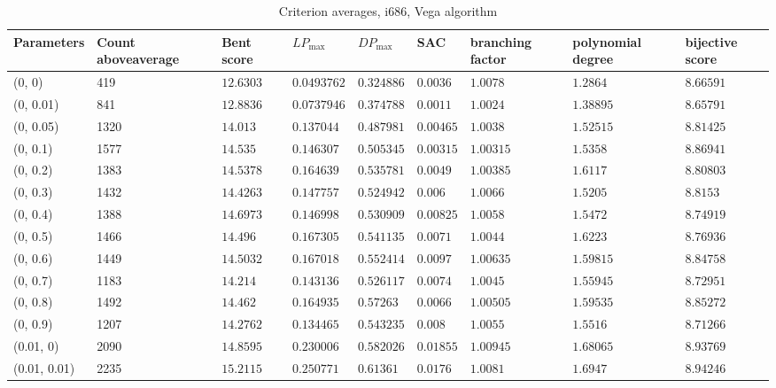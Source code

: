 \begin{center}
{\begin{longtable}{| l | p{} |  p{} | p{} | p{} | p{} | p{} | p{} | p{} |}
\caption{Criterion averages, i686, Vega algorithm}\label{tabVegaParametersLuffa}\\
\hline
Parameters & Count above\-average  & Bent score & $LP_{\max}$ & $DP_{\max}$ & SAC & branching factor & polynomial degree & bijective score \\ \hline
\endhead
 (0, 0) & 419  & $12.6303$ & $0.0493762$ & $0.324886$ & $0.0036$ & $1.0078$ & $1.2864$ & $8.66591$ \\ \hline
 (0, 0.01) & 841  & $12.8836$ & $0.0737946$ & $0.374788$ & $0.0011$ & $1.0024$ & $1.38895$ & $8.65791$ \\ \hline
 (0, 0.05) & 1320  & $14.013$ & $0.137044$ & $0.487981$ & $0.00465$ & $1.0038$ & $1.52515$ & $8.81425$ \\ \hline
 (0, 0.1) & 1577  & $14.535$ & $0.146307$ & $0.505345$ & $0.00315$ & $1.00315$ & $1.5358$ & $8.86941$ \\ \hline
 (0, 0.2) & 1383  & $14.5378$ & $0.164639$ & $0.535781$ & $0.0049$ & $1.00385$ & $1.6117$ & $8.80803$ \\ \hline
 (0, 0.3) & 1432  & $14.4263$ & $0.147757$ & $0.524942$ & $0.006$ & $1.0066$ & $1.5205$ & $8.8153$ \\ \hline
 (0, 0.4) & 1388  & $14.6973$ & $0.146998$ & $0.530909$ & $0.00825$ & $1.0058$ & $1.5472$ & $8.74919$ \\ \hline
 (0, 0.5) & 1466  & $14.496$ & $0.167305$ & $0.541135$ & $0.0071$ & $1.0044$ & $1.6223$ & $8.76936$ \\ \hline
 (0, 0.6) & 1449  & $14.5032$ & $0.167018$ & $0.552414$ & $0.0097$ & $1.00635$ & $1.59815$ & $8.84758$ \\ \hline
 (0, 0.7) & 1183  & $14.214$ & $0.143136$ & $0.526117$ & $0.0074$ & $1.0045$ & $1.55945$ & $8.72951$ \\ \hline
 (0, 0.8) & 1492  & $14.462$ & $0.164935$ & $0.57263$ & $0.0066$ & $1.00505$ & $1.59535$ & $8.85272$ \\ \hline
 (0, 0.9) & 1207  & $14.2762$ & $0.134465$ & $0.543235$ & $0.008$ & $1.0055$ & $1.5516$ & $8.71266$ \\ \hline
 (0.01, 0) & 2090  & $14.8595$ & $0.230006$ & $0.582026$ & $0.01855$ & $1.00945$ & $1.68065$ & $8.93769$ \\ \hline
 (0.01, 0.01) & 2235  & $15.2115$ & $0.250771$ & $0.61361$ & $0.0176$ & $1.0081$ & $1.6947$ & $8.94246$ \\ \hline

\end{longtable}}
\end{center}
